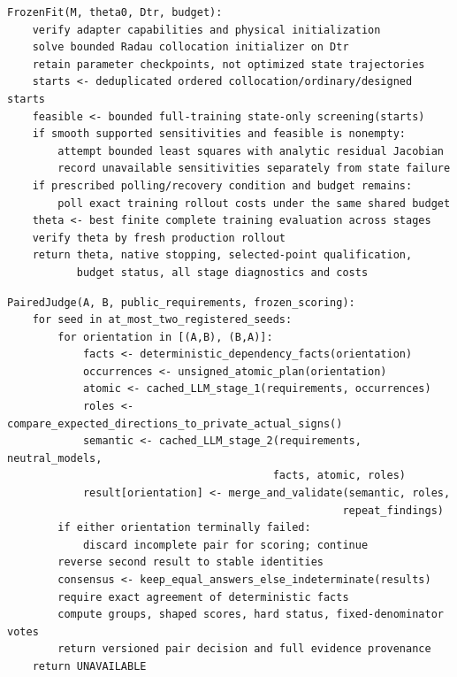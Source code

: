 \documentclass[11pt]{article}
\begin{document}
\noindent\begin{minipage}{\linewidth}
\begin{lstlisting}[caption={One frozen training-only numerical allocation.}]
FrozenFit(M, theta0, Dtr, budget):
    verify adapter capabilities and physical initialization
    solve bounded Radau collocation initializer on Dtr
    retain parameter checkpoints, not optimized state trajectories
    starts <- deduplicated ordered collocation/ordinary/designed starts
    feasible <- bounded full-training state-only screening(starts)
    if smooth supported sensitivities and feasible is nonempty:
        attempt bounded least squares with analytic residual Jacobian
        record unavailable sensitivities separately from state failure
    if prescribed polling/recovery condition and budget remains:
        poll exact training rollout costs under the same shared budget
    theta <- best finite complete training evaluation across stages
    verify theta by fresh production rollout
    return theta, native stopping, selected-point qualification,
           budget status, all stage diagnostics and costs
\end{lstlisting}
\end{minipage}
\par\medskip

\noindent\begin{minipage}{\linewidth}
\begin{lstlisting}[caption={Optional paired scientific judge.}]
PairedJudge(A, B, public_requirements, frozen_scoring):
    for seed in at_most_two_registered_seeds:
        for orientation in [(A,B), (B,A)]:
            facts <- deterministic_dependency_facts(orientation)
            occurrences <- unsigned_atomic_plan(orientation)
            atomic <- cached_LLM_stage_1(requirements, occurrences)
            roles <- compare_expected_directions_to_private_actual_signs()
            semantic <- cached_LLM_stage_2(requirements, neutral_models,
                                          facts, atomic, roles)
            result[orientation] <- merge_and_validate(semantic, roles,
                                                     repeat_findings)
        if either orientation terminally failed:
            discard incomplete pair for scoring; continue
        reverse second result to stable identities
        consensus <- keep_equal_answers_else_indeterminate(results)
        require exact agreement of deterministic facts
        compute groups, shaped scores, hard status, fixed-denominator votes
        return versioned pair decision and full evidence provenance
    return UNAVAILABLE
\end{lstlisting}
\end{minipage}
\par\medskip
\end{document}
